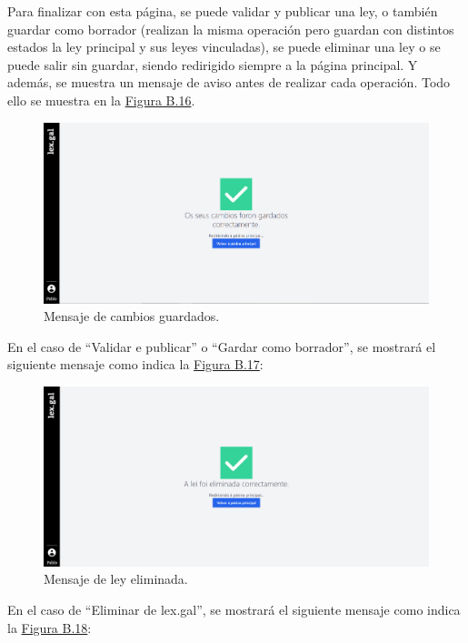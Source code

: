 Para finalizar con esta página, se puede validar y publicar una ley, o también guardar como borrador (realizan la misma operación pero guardan con distintos estados la ley principal y sus leyes vinculadas), se puede eliminar una ley o se puede salir sin guardar, siendo redirigido siempre a la página principal. Y además, se muestra un mensaje de aviso antes de realizar cada operación. Todo ello se muestra en la \hyperref[enlaceLeyesVinculadas]{Figura B.16}.
\\

\begin{figure}[H]
\centerline{\includegraphics[width=15cm]{figuras/manualUsuario/MensajeGuardado.PNG}}
\caption{Mensaje de cambios guardados.}
\label{enlaceCambiosGuardados}
\end{figure}

En el caso de ``Validar e publicar'' o ``Gardar como borrador'', se mostrará el siguiente mensaje como indica la \hyperref[enlaceNotas]{Figura B.17}:

\begin{figure}[H]
\centerline{\includegraphics[width=15cm]{figuras/manualUsuario/MensajeEliminada.PNG}}
\caption{Mensaje de ley eliminada.}
\label{enlaceLeyEliminada}
\end{figure}

En el caso de ``Eliminar de lex.gal'', se mostrará el siguiente mensaje como indica la \hyperref[enlaceNotas]{Figura B.18}: